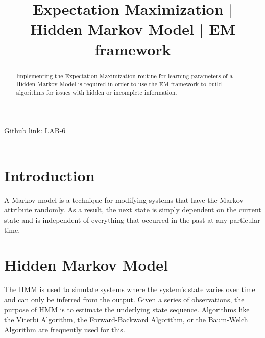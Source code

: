 \documentclass[letterpaper, 12 pt, conference]{IEEEtran}
\begin{document}
\title{Expectation Maximization $|$ Hidden Markov Model $|$ EM framework}
\author{
\and
{}
\and
{}
\and
{}
}

\maketitle

\setlength{\parindent}{20pt}
\noindent Github link: \href{https://github.com/JARVIS-codebase/LAB-6}{LAB-6} \\ \\
\indent \begin{abstract}
Implementing the Expectation Maximization routine for learning parameters of a Hidden Markov Model is required in order to use the EM framework to build algorithms for issues with hidden or incomplete information.
\end{abstract}

\section{Introduction}
A Markov model is a technique for modifying systems that have the Markov attribute randomly.
As a result, the next state is simply dependent on the current state and is independent of everything that occurred in the past at any particular time.\\
\section{Hidden Markov Model}
\indent The HMM is used to simulate systems where the system's state varies over time and can only be inferred from the output. Given a series of observations, the purpose of HMM is to estimate the underlying state sequence. Algorithms like the Viterbi Algorithm, the Forward-Backward Algorithm, or the Baum-Welch Algorithm are frequently used for this.\\
\end{document}
